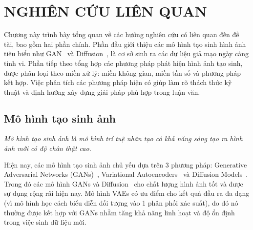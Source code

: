 \chapter{NGHIÊN CỨU LIÊN QUAN}
\label{Chapter2}
%
Chương này trình bày tổng quan về các hướng nghiên cứu có liên quan đến đề tài, bao gồm hai phần chính. Phần đầu giới thiệu các mô hình tạo sinh hình ảnh tiêu biểu như GAN~\cite{Goodfellow2014GenerativeAN} và Diffusion~\cite{Ho2020DenoisingDP}, là cơ sở sinh ra các dữ liệu giả mạo ngày càng tinh vi. Phần tiếp theo tổng hợp các phương pháp phát hiện hình ảnh tạo sinh, được phân loại theo miền xử lý: miền không gian, miền tần số và phương pháp kết hợp. Việc phân tích các phương pháp hiện có giúp làm rõ thách thức kỹ thuật và định hướng xây dựng giải pháp phù hợp trong luận văn.
%
\section{Mô hình tạo sinh ảnh}
\textit{Mô hình tạo sinh ảnh là mô hình trí tuệ nhân tạo có khả năng sáng tạo ra hình ảnh mới có độ chân thật cao.}

Hiện nay, các mô hình tạo sinh ảnh chủ yếu dựa trên 3 phương pháp: Generative Adversarial Networks (GANs)~\cite{Goodfellow2014GenerativeAN}, Variational
 Autoencoders~\cite{Kingma2013AutoEncodingVB} và Diffusion Models~\cite{Ho2020DenoisingDP}. Trong đó các mô hình GANs\cite{Goodfellow2014GenerativeAN} và Diffusion~\cite{Ho2020DenoisingDP} cho chất lượng hình ảnh tốt và được sự dụng rộng rãi hiện nay. Mô hình VAEs có ưu điểm cho kết quả đầu ra đa dạng (vì mô hình học cách biểu diễn đối tượng vào 1 phân phối xác suất), do đó nó thường được kết hợp với GANs nhằm tăng khả năng linh hoạt và độ ổn định trong việc sinh dữ liệu mới.
